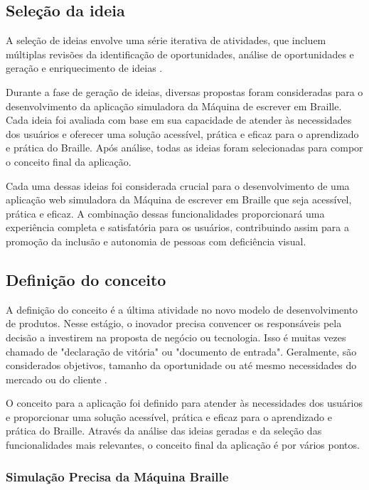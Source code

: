 \subsection{Seleção da ideia}

A seleção de ideias envolve uma série iterativa de atividades, que incluem múltiplas revisões da identificação de oportunidades, análise de oportunidades e geração e enriquecimento de ideias \parencite{BOOK01}. 

Durante a fase de geração de ideias, diversas propostas foram consideradas para o desenvolvimento da aplicação simuladora da Máquina de escrever em Braille. Cada ideia foi avaliada com base em sua capacidade de atender às necessidades dos usuários e oferecer uma solução acessível, prática e eficaz para o aprendizado e prática do Braille. Após análise, todas as ideias foram selecionadas para compor o conceito final da aplicação.

Cada uma dessas ideias foi considerada crucial para o desenvolvimento de uma aplicação web simuladora da Máquina de escrever em Braille que seja acessível, prática e eficaz. A combinação dessas funcionalidades proporcionará uma experiência completa e satisfatória para os usuários, contribuindo assim para a promoção da inclusão e autonomia de pessoas com deficiência visual.

\subsection{Definição do conceito}

A definição do conceito é a última atividade no novo modelo de desenvolvimento de produtos. Nesse estágio, o inovador precisa convencer os responsáveis pela decisão a investirem na proposta de negócio ou tecnologia. Isso é muitas vezes chamado de "declaração de vitória" ou "documento de entrada". Geralmente, são considerados objetivos, tamanho da oportunidade ou até mesmo necessidades do mercado ou do cliente \parencite{BOOK01}.

O conceito para a aplicação foi definido para atender às necessidades dos usuários e proporcionar uma solução acessível, prática e eficaz para o aprendizado e prática do Braille. Através da análise das ideias geradas e da seleção das funcionalidades mais relevantes, o conceito final da aplicação é por vários pontos.

\subsubsection{Simulação Precisa da Máquina Braille}

